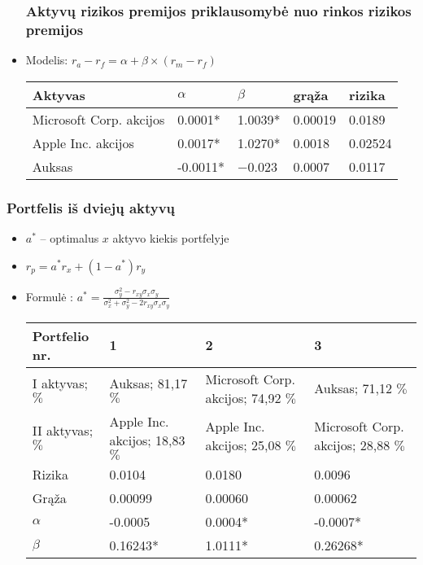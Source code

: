 \documentclass[utf8,hyperref={unicode},xcolor=dvipsnames]{beamer}
\theoremstyle{change}\newtheorem{teorema}{Teiginys}
\theoremstyle{change}\newtheorem{salyga}{}
\begin{document}
\begin{frame}
    \begin{itemize}
    \frametitle{Aktyvų rizikos premijos priklausomybė nuo rinkos rizikos premijos} 
\item Modelis: $r_a - r_f = \alpha + \beta \times (r_m - r_f)$

\begin{table}[ht]
\begin{center}
    \begin{tabular}{ | l | l | l | l | l |}
    \hline
    Aktyvas & $\alpha $&$\beta$ &  grąža & rizika  \\
    \hline
  Microsoft Corp. akcijos & 0.0001* & 1.0039* & 0.00019 & 0.0189 \\
	Apple Inc. akcijos & 0.0017* & 1.0270* & 0.0018 & 0.02524 \\
  Auksas & -0.0011* & −0.023 & 0.0007 & 0.0117 \\
	\hline
    \end{tabular}
\end{center}
\end{table}
	    \end{itemize}
\end{frame}
\begin{frame}
    \frametitle{Portfelis iš dviejų aktyvų}
    \begin{itemize}
\item $a^{\ast}$ -- optimalus $x$ aktyvo kiekis portfelyje
\item $r_p = a^{\ast}r_x + (1 - a^{\ast})r_y$
	\item Formulė : $a^{\ast}= \frac{\sigma_y^2 - r_{xy}\sigma_x \sigma_y}{\sigma^2_x + \sigma^2_y - 2r_{xy}\sigma_x \sigma_y} \label{form}$


\begin{table}[ht]
\begin{center}

\resizebox{11cm}{!} {
    \begin{tabular}{ | l | l | l | l | }
    \hline
    Portfelio nr. & 1 & 2 & 3\\
    \hline
    I aktyvas; $\%$ & Auksas; 81,17 $\%$ & Microsoft Corp. akcijos; 74,92 $\%$ & Auksas; 71,12 $\%$ \\
    \hline
    II aktyvas; $\%$ & Apple Inc. akcijos; 18,83 $\%$ & Apple Inc. akcijos; 25,08 $\%$ & Microsoft Corp. akcijos; 28,88 $\%$ \\
    \hline
    Rizika & 0.0104 & 0.0180 & 0.0096 \\
    \hline
    Grąža & 0.00099 & 0.00060 & 0.00062 \\
\hline
$\alpha$ & -0.0005 & 0.0004* & -0.0007* \\
    \hline
    $\beta$ & 0.16243* & 1.0111* & 0.26268*\\
	\hline	
    \end{tabular}
    }

\end{center}
\end{table}

\end{itemize}
\end{frame}
\end{document}
